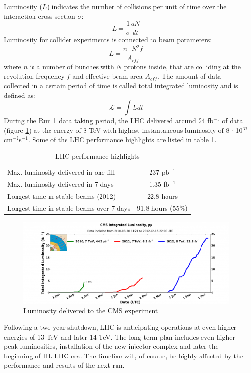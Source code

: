Luminosity ($L$) indicates the number of collisions per unit of time over the interaction cross section $\sigma$:
\begin{equation}
L=\frac{1}{\sigma}\frac{dN}{dt}
\end{equation}
Luminosity for collider experiments is connected to beam parameters:
\begin{equation}
L=\frac{n\cdot N^2 f}{A_{eff}}
\end{equation}
where $n$ is a number of bunches with $N$ protons inside, that are colliding at the revolution frequency $f$ and effective beam area $A_{eff}$. The amount of data collected in a certain period of time is called total integrated luminosity and is defined as:
\begin{equation}
\mathcal{L} = \int L dt
\end{equation} 
During the Run 1 data taking period, the LHC delivered around 24 fb$^{-1}$ of data (figure \ref{fig:LHC_lumi}) at the energy of 8 TeV with highest instantaneous luminosity of 8 $\cdot$ 10$^{33}$ cm$^{-2}$s$^{-1}$. Some of the LHC performance highlights are listed in table \ref{tab:LHC_highlights}.
\begin{table}[h]
\centering
  \caption{LHC performance highlights}
  \label{tab:LHC_highlights}
  \begin{tabular}{ l  c }
      \hline
      \hline
      Max. luminosity delivered in one fill & 237 pb$^{-1}$  \\
      Max. luminosity delivered in 7 days & 1.35 fb$^{-1}$  \\
      Longest time in stable beams (2012) & 22.8 hours \\
      Longest time in stable beams over 7 days & 91.8 hours (55$\%$) \\
      \hline
      \hline 
  \end{tabular}
\end{table}
\begin{figure}[htbp]
	\centering
		\includegraphics[width=\textwidth]{Figures/lumi.png}
	\caption[Luminosity delivered to the CMS experiment]{Luminosity delivered to the CMS experiment}
	\label{fig:LHC_lumi}
\end{figure} 
\par Following a two year shutdown, LHC is anticipating operations at even higher energies of 13 TeV and later 14 TeV. The long term plan includes even higher peak luminosities, installation of the new injector complex and later the beginning of HL-LHC era. The timeline will, of course, be highly affected by the performance and results of the next run.